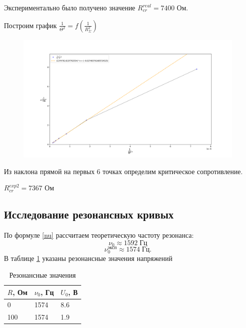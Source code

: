 \documentclass{lab}
\begin{document}
Экспериментально было получено значение $R_{cr}^{real} = 7400$ Ом.

Построим график $\frac{1}{\Theta^2} = f (\frac{1}{R_\Sigma^2})$

\begin{figure}[h!]
\begin{center}
\includegraphics[width=1\textwidth]{graph1.png}
\end{center}
\end{figure}

Из наклона прямой на первых 6 точках определим критическое сопротивление.

$R_{cr}^{exp2} = 7367$ Ом

\subsection{Исследование резонансных кривых}

По формуле \ref{nu} рассчитаем теоретическую частоту резонанса:
\begin{equation}
    \nu_0\approx 1592 \; \text{Гц}
\end{equation}
\begin{equation}
    \nu_0^\text{эксп} \approx 1574 \; \text{Гц}.
\end{equation}
В таблице \ref{res} указаны резонансные значения напряжений

\begin{table}[]
    \centering
    \begin{tabular}{|l|l|l|}
        \hline
        \textbf{$R$, Ом} & \textbf{$\nu_0$, Гц} & \textbf{$U_0$, В} \\ \hline
        0                & 1574                 & 8.6               \\ \hline
        100              & 1574                 & 1.9               \\ \hline
    \end{tabular}
    \caption{Резонансные значения}
    \label{res}
\end{table}
\end{document}
